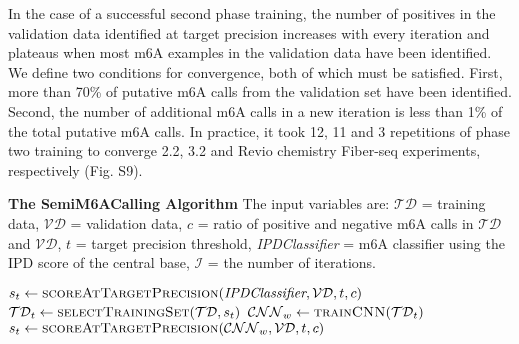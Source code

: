 \documentclass{article}
\begin{document}
In the case of a successful second phase training, the number of positives in the validation data identified at target precision increases with every iteration and plateaus when most m6A examples in the validation data have been identified. We define two conditions for convergence, both of which must be satisfied. First, more than 70\% of putative m6A calls from the validation set have been identified. Second, the number of additional m6A calls in a new iteration is less than 1\% of the total putative m6A calls. In practice, it took 12, 11 and 3 repetitions of phase two training to converge 2.2, 3.2 and Revio chemistry Fiber-seq experiments, respectively (Fig. S9).  

\begin{algorithm}
\caption{\textbf{The SemiM6ACalling Algorithm} The input variables are: $\mathcal{TD}$ = training data, $\mathcal{VD}$ = validation data, $c$ = ratio of positive and negative m6A calls in $\mathcal{TD}$ and $\mathcal{VD}$, $t$ = target precision threshold, \textit{IPDClassifier} = m6A classifier using the IPD score of the central base, $\mathcal{I}$ = the number of iterations. }\label{alg:cap}
\begin{algorithmic}
    \State $s_t\gets\Call{\text{scoreAtTargetPrecision}}{\textit{IPDClassifier}, \mathcal{VD}, t, c}$ 
        \State $\mathcal{TD}_t\gets\Call{\text{selectTrainingSet}}{\mathcal{TD}, s_t}$ 
        \State $\mathcal{CNN}_w\gets\Call{\text{trainCNN}}{\mathcal{TD}_t}$ 
        \State $s_t\gets\Call{\text{scoreAtTargetPrecision}}{\mathcal{CNN}_w, \mathcal{VD}, t, c}$ 
    \EndFor    
    \State {}
        
\EndProcedure

\end{algorithmic}
\end{algorithm}




\end{document}
